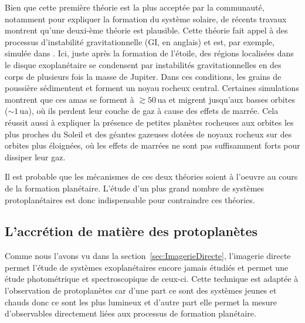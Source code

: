 Bien que cette première théorie est la plus acceptée par la communauté, notamment pour expliquer la formation du système solaire, de récents travaux montrent qu'une deuxi\hyp{}ème théorie est plausible. Cette théorie fait appel à des processus d'instabilité gravitationnelle (\ac{GI}, en anglais) et est, par exemple, simulée dans \cite{nayakshin2017}. Ici, juste après la formation de l'étoile, des régions localisées dans le disque exoplanétaire se condensent par instabilités gravitationnelles en des corps de plusieurs fois la masse de Jupiter. Dans ces conditions, les grains de poussière sédimentent et forment un noyau rocheux central. Certaines simulations \citep{boley2010} montrent que ces amas se forment à $\gtrsim 50 \,$ua et migrent jusqu'aux basses orbites ($\sim 1 \,$ua), où ils perdent leur couche de gaz à cause des effets de marrée. Cela réussit aussi à expliquer la présence de petites planètes rocheuses aux orbites les plus proches du Soleil et des géantes gazeuses dotées de noyaux rocheux sur des orbites plus éloignées, où les effets de marrées ne sont pas suffisamment forts pour dissiper leur gaz.

Il est probable que les mécanismes de ces deux théories soient à l'oeuvre au cours de la formation planétaire. L'étude d'un plus grand nombre de systèmes protoplanétaires est donc indispensable pour contraindre ces théories.


\subsection{L'accrétion de matière des protoplanètes}
\label{sec:AccretionAlpha}

Comme nous l'avons vu dans la section~\ref{sec:ImagerieDirecte}, l'imagerie directe permet l'étude de systèmes exoplanétaires encore jamais étudiés et permet une étude photométrique et spectroscopique de ceux-ci. Cette technique est adaptée à l'observation de protoplanètes car d'une part ce sont des systèmes jeunes et chauds donc ce sont les plus lumineux et d'autre part elle permet la mesure d'observables directement liées aux processus de formation planétaire.


